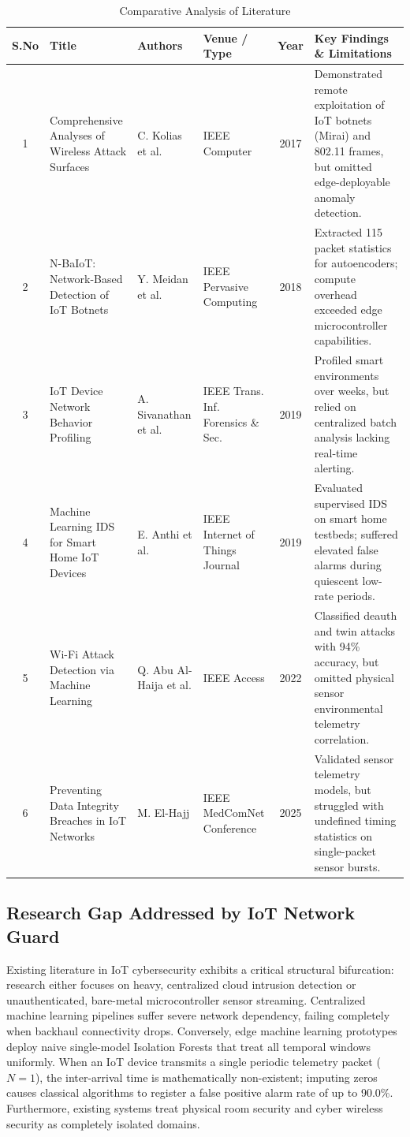 \documentclass[11pt,a4paper]{report}
\begin{document}
\begin{table}[htbp]
\centering
\caption{Comparative Analysis of Literature}\label{tab:lit_comparison}
\vspace{4pt}
{\scriptsize
\begin{tabular}{|c|p{3.2cm}|p{2.3cm}|p{2.2cm}|c|p{4.0cm}|}
\hline
\rowcolor{black!10}
\textbf{S.No} & \textbf{Title} & \textbf{Authors} & \textbf{Venue / Type} & \textbf{Year} & \textbf{Key Findings \& Limitations} \\
\hline
1 & Comprehensive Analyses of Wireless Attack Surfaces & C. Kolias et al. & IEEE Computer & 2017 & Demonstrated remote exploitation of IoT botnets (Mirai) and 802.11 frames, but omitted edge-deployable anomaly detection. \\
\hline
2 & N-BaIoT: Network-Based Detection of IoT Botnets & Y. Meidan et al. & IEEE Pervasive Computing & 2018 & Extracted 115 packet statistics for autoencoders; compute overhead exceeded edge microcontroller capabilities. \\
\hline
3 & IoT Device Network Behavior Profiling & A. Sivanathan et al. & IEEE Trans. Inf. Forensics \& Sec. & 2019 & Profiled smart environments over weeks, but relied on centralized batch analysis lacking real-time alerting. \\
\hline
4 & Machine Learning IDS for Smart Home IoT Devices & E. Anthi et al. & IEEE Internet of Things Journal & 2019 & Evaluated supervised IDS on smart home testbeds; suffered elevated false alarms during quiescent low-rate periods. \\
\hline
5 & Wi-Fi Attack Detection via Machine Learning & Q. Abu Al-Haija et al. & IEEE Access & 2022 & Classified deauth and twin attacks with 94\% accuracy, but omitted physical sensor environmental telemetry correlation. \\
\hline
6 & Preventing Data Integrity Breaches in IoT Networks & M. El-Hajj & IEEE MedComNet Conference & 2025 & Validated sensor telemetry models, but struggled with undefined timing statistics on single-packet sensor bursts. \\
\hline
\end{tabular}
}
\end{table}

\subsection{Research Gap Addressed by IoT Network Guard}
Existing literature in IoT cybersecurity exhibits a critical structural bifurcation: research either focuses on heavy, centralized cloud intrusion detection or unauthenticated, bare-metal microcontroller sensor streaming. Centralized machine learning pipelines suffer severe network dependency, failing completely when backhaul connectivity drops. Conversely, edge machine learning prototypes deploy naive single-model Isolation Forests that treat all temporal windows uniformly. When an IoT device transmits a single periodic telemetry packet ($N = 1$), the inter-arrival time is mathematically non-existent; imputing zeros causes classical algorithms to register a false positive alarm rate of up to 90.0\%. Furthermore, existing systems treat physical room security and cyber wireless security as completely isolated domains. 
\end{document}
